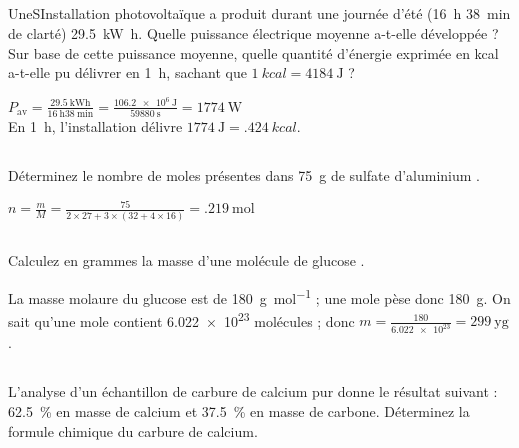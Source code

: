 \subsection{}
UneSInstallation photovoltaïque a produit durant une journée d'été (\SI{16}{\hour} \SI{38}{\minute} de clarté) \SI{29.5}{\kilo\watt\hour}. Quelle puissance électrique moyenne a-t-elle développée ? Sur base de cette puissance moyenne, quelle quantité d'énergie exprimée en kcal a-t-elle pu délivrer en \SI{1}{\hour}, sachant que $ \SI{1}{kcal} = \SI{4184}{\joule} $ ?

\begin{solution}
    $ P_\mathrm{av} = \frac{\SI{29.5}{\kilo\watt\hour}}{\SI{16}{\hour} \SI{38}{\minute}} = \frac{\SI{106.2e6}{\joule}}{\SI{59880}{\second}} = \SI{1774}{\watt} $ \\
    En \SI{1}{\hour}, l'installation délivre $ \SI{1774}{\joule} = \SI{.424}{kcal} $.
\end{solution}

\subsection{}
Déterminez le nombre de moles présentes dans \SI{75}{\gram} de sulfate d'aluminium .

\begin{solution}
    $ n = \frac{m}{M} = \frac{75}{2 \times 27 + 3 \times (32 + 4 \times 16)} = \SI{.219}{\mole} $
\end{solution}

\subsection{}
Calculez en grammes la masse d'une molécule de glucose .

\begin{solution}
    La masse molaure du glucose est de \SI{180}{\gram\per\mole} ; une mole pèse donc \SI{180}{\gram}. On sait qu'une mole contient \num{6.022e23} molécules ; donc $ m = \frac{\num{180}}{\num{6.022e23}} = \SI{299}{\yocto\gram} $.
\end{solution}

\subsection{}
L'analyse d'un échantillon de carbure de calcium pur donne le résultat suivant : \SI{62.5}{\%} en masse de calcium et \SI{37.5}{\%} en masse de carbone. Déterminez la formule chimique du carbure de calcium.

